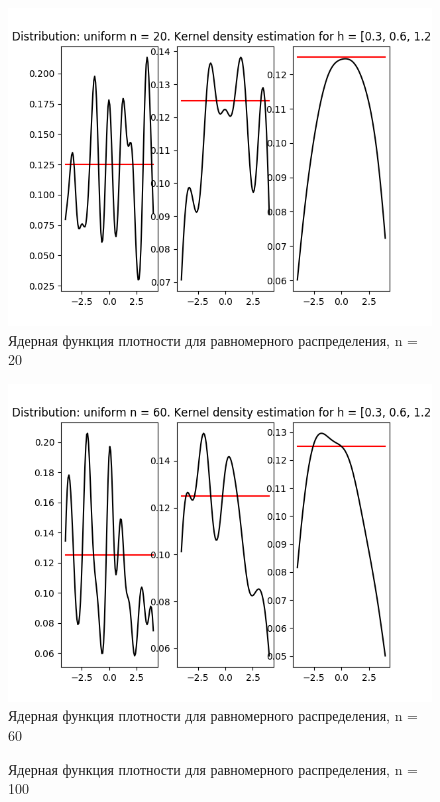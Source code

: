 \documentclass[12pt]{article}
\begin{document}
\begin{center}
    \begin{figure}[H]
 \caption{Ядерная функция плотности для равномерного распределения, n = 20}
\includegraphics[width=\textwidth]{kernel/d_uniform20.png}
\end{figure}
    \begin{figure}[H]
 \caption{Ядерная функция плотности для равномерного распределения, n = 60}
\includegraphics[width=\textwidth]{kernel/d_uniform60.png}
\end{figure}
    \begin{figure}[H]
 \caption{Ядерная функция плотности для равномерного распределения, n = 100}

\end{figure}
\end{center}
\end{document}
